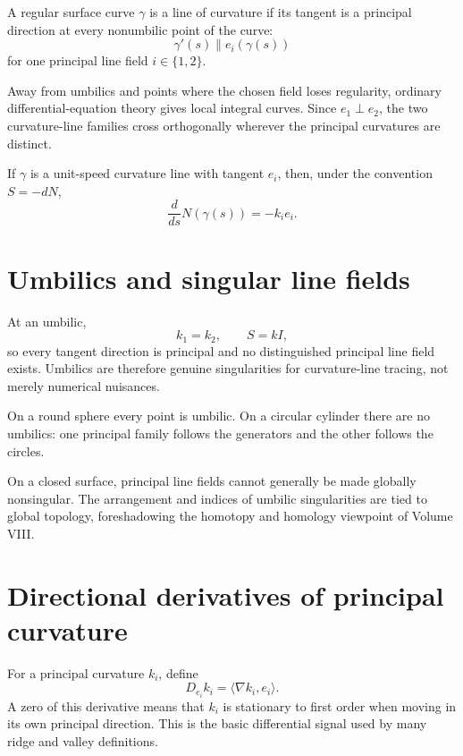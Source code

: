 \begin{definition}\label{def:vii42-curvature-line}
A regular surface curve \(\gamma\) is a line of curvature if its tangent is a
principal direction at every nonumbilic point of the curve:
\[
\gamma'(s)\parallel e_i(\gamma(s))
\]
for one principal line field \(i\in\{1,2\}\).
\end{definition}

Away from umbilics and points where the chosen field loses regularity, ordinary
differential-equation theory gives local integral curves.  Since \(e_1\perp
e_2\), the two curvature-line families cross orthogonally wherever the
principal curvatures are distinct.

\begin{proposition}\label{prop:vii42-normal}
If \(\gamma\) is a unit-speed curvature line with tangent \(e_i\), then, under
the convention \(S=-dN\),
\[
\frac{d}{ds}N(\gamma(s))=-k_i e_i.
\]
\end{proposition}

\section{Umbilics and singular line fields}

At an umbilic,
\[
k_1=k_2,
\qquad
S=kI,
\]
so every tangent direction is principal and no distinguished principal line
field exists.  Umbilics are therefore genuine singularities for curvature-line
tracing, not merely numerical nuisances.

On a round sphere every point is umbilic.  On a circular cylinder there are no
umbilics: one principal family follows the generators and the other follows the
circles.

\begin{remark}\label{rem:vii42-topology}
On a closed surface, principal line fields cannot generally be made globally
nonsingular.  The arrangement and indices of umbilic singularities are tied to
global topology, foreshadowing the homotopy and homology viewpoint of Volume
VIII.
\end{remark}

\section{Directional derivatives of principal curvature}

For a principal curvature \(k_i\), define
\[
D_{e_i}k_i=\langle\nabla k_i,e_i\rangle.
\]
A zero of this derivative means that \(k_i\) is stationary to first order when
moving in its own principal direction.  This is the basic differential signal
used by many ridge and valley definitions.

